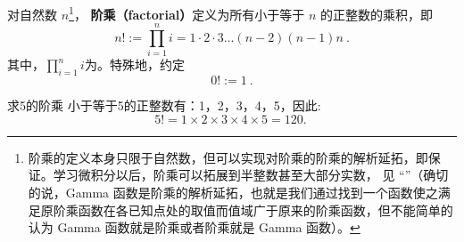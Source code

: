 
\begin{issues}
\issueDraft
\end{issues}


对自然数 $n$\footnote{阶乘的定义本身只限于自然数，但可以实现对阶乘的阶乘的解析延拓，即保证。学习微积分以后，阶乘可以拓展到半整数甚至大部分实数， 见 “”（确切的说，Gamma 函数是阶乘的解析延拓，也就是我们通过找到一个函数使之满足原阶乘函数在各已知点处的取值而值域广于原来的阶乘函数，但不能简单的认为 Gamma 函数就是阶乘或者阶乘就是 Gamma 函数）。}， \textbf{阶乘（factorial）}定义为所有小于等于 $n$ 的正整数的乘积，即
\begin{equation}
n! := \prod_{i = 1}^n i =1 \cdot 2 \cdot 3 \dots (n - 2) (n - 1)n~.
\end{equation}
其中，$\prod_{i = 1}^n i$为。特殊地，约定
\begin{equation}
0! := 1~.
\end{equation}

\begin{example}{求5的阶乘}
小于等于5的正整数有：1，2，3，4，5，因此:
$$5! = 1\times 2\times 3\times 4\times 5 = 120.~$$
\end{example}

